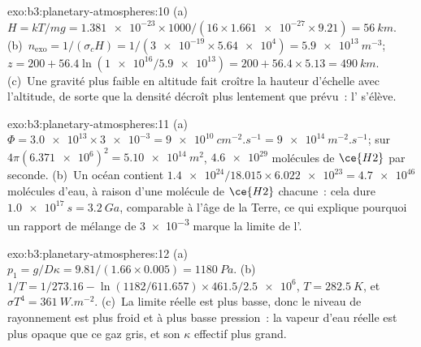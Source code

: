 \begin{solution}{exo:b3:planetary-atmospheres:10}
(a)~$H = kT/mg = \num{1.381e-23}\times1000/(16\times\num{1.661e-27}\times9.21)
= \qty{56}{km}$. (b)~$n_\mathrm{exo} = 1/(\sigma_c H) = 1/(\num{3e-19}\times
\num{5.64e4}) = \qty{5.9e13}{m^{-3}}$; $z = 200 + 56.4\ln(\num{1e16}/
\num{5.9e13}) = 200 + 56.4\times5.13 = \qty{490}{km}$. (c)~Une gravité plus faible
en altitude fait croître la hauteur d'échelle avec l'altitude, de sorte que la densité
décroît plus lentement que prévu~: l' s'élève.
\end{solution}

\begin{solution}{exo:b3:planetary-atmospheres:11}
(a)~$\Phi = \num{3.0e13}\times\num{3e-3} = \qty{9e10}{cm^{-2}.s^{-1}} =
\qty{9e14}{m^{-2}.s^{-1}}$; sur $4\pi(\num{6.371e6})^2 =
\qty{5.10e14}{m^2}$, $\num{4.6e29}$ molécules de $\ce{H2}$ par seconde.
(b)~Un océan contient $\num{1.4e24}/18.015\times\num{6.022e23} =
\num{4.7e46}$ molécules d'eau, à raison d'une molécule de $\ce{H2}$ chacune~: cela dure
$\qty{1.0e17}{s} = \qty{3.2}{Ga}$, comparable à l'âge de
la Terre, ce qui explique pourquoi un rapport de mélange de \num{3e-3} marque la
limite de l'.
\end{solution}

\begin{solution}{exo:b3:planetary-atmospheres:12}
(a)~$p_1 = g/D\kappa = 9.81/(1.66\times0.005) = \qty{1180}{Pa}$.
(b)~$1/T = 1/273.16 - \ln(1182/611.657)\times461.5/\num{2.5e6}$, $T =
\qty{282.5}{K}$, et $\sigma T^4 = \qty{361}{W.m^{-2}}$. (c)~La limite réelle
est plus basse, donc le niveau de rayonnement est plus froid et à plus basse pression~: la
vapeur d'eau réelle est plus opaque que ce gaz gris, et son $\kappa$ effectif
plus grand.
\end{solution}

